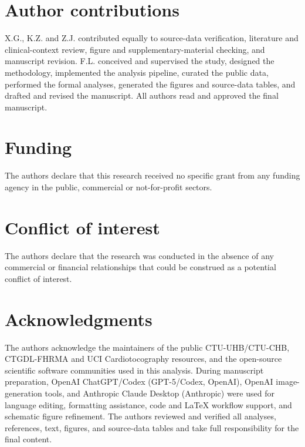 \documentclass[11pt]{article}
\begin{document}
\section*{Author contributions}
X.G., K.Z. and Z.J. contributed equally to source-data verification, literature and clinical-context review, figure and supplementary-material checking, and manuscript revision. F.L. conceived and supervised the study, designed the methodology, implemented the analysis pipeline, curated the public data, performed the formal analyses, generated the figures and source-data tables, and drafted and revised the manuscript. All authors read and approved the final manuscript.

\section*{Funding}
The authors declare that this research received no specific grant from any funding agency in the public, commercial or not-for-profit sectors.

\section*{Conflict of interest}
The authors declare that the research was conducted in the absence of any commercial or financial relationships that could be construed as a potential conflict of interest.

\section*{Acknowledgments}
The authors acknowledge the maintainers of the public CTU-UHB/CTU-CHB, CTGDL-FHRMA and UCI Cardiotocography resources, and the open-source scientific software communities used in this analysis. During manuscript preparation, OpenAI ChatGPT/Codex (GPT-5/Codex, OpenAI), OpenAI image-generation tools, and Anthropic Claude Desktop (Anthropic) were used for language editing, formatting assistance, code and LaTeX workflow support, and schematic figure refinement. The authors reviewed and verified all analyses, references, text, figures, and source-data tables and take full responsibility for the final content.
\end{document}
